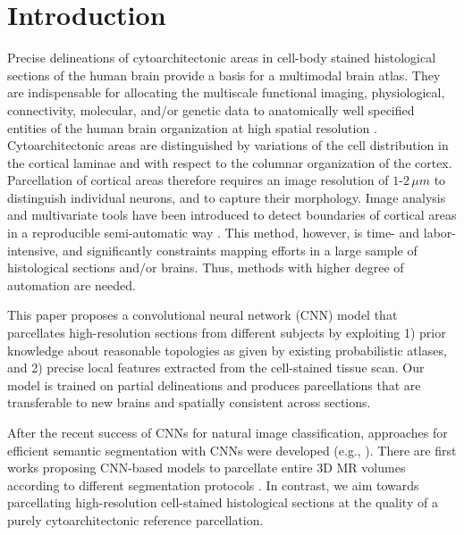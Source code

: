 \documentclass{article}
\begin{document}
\section{Introduction}
\label{sec:intro}
%
Precise delineations of cytoarchitectonic areas in cell-body stained histological sections of the human brain provide a basis for a multimodal brain atlas.
They are indispensable for allocating the multiscale functional imaging, physiological, connectivity, molecular, and/or genetic data to anatomically well specified entities of the human brain organization at high spatial resolution \cite{amunts2015}.
Cytoarchitectonic areas are distinguished by variations of the cell distribution in the cortical laminae and with respect to the columnar organization of the cortex.
Parcellation of cortical areas therefore requires an image resolution of $1$-$2\,\mu m$ to distinguish individual neurons, and to capture their morphology.
Image analysis and multivariate tools have been introduced to detect boundaries of cortical areas in a reproducible semi-automatic way \cite{schleicher1999}.
This method, however, is time- and labor-intensive, and significantly constraints mapping efforts in a large sample of histological sections and/or brains.
Thus, methods with higher degree of automation are needed.

This paper proposes a convolutional neural network (CNN) model that parcellates high-resolution sections from different subjects by exploiting 1) prior knowledge about reasonable topologies as given by existing probabilistic atlases, and 2) precise local features extracted from the cell-stained tissue scan.
Our model is trained on partial delineations and produces parcellations that are transferable to new brains and spatially consistent across sections.


After the recent success of CNNs for natural image classification, approaches for efficient semantic segmentation with CNNs were developed (e.g., \cite{ronneberger2015}).
There are first works proposing CNN-based models to parcellate entire 3D MR volumes according to different segmentation protocols \cite{brebisson2015, lee2011}.
In contrast, we aim towards parcellating high-resolution cell-stained histological sections at the quality of a purely cytoarchitectonic reference parcellation.
\end{document}
